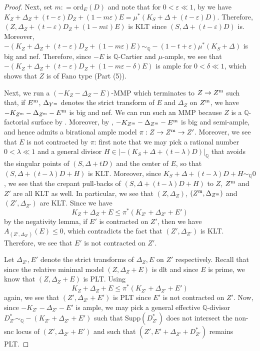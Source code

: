 \documentclass[11pt,reqno]{amsart}
\newcommand{\Q}{\mathbb{Q}}
\newcommand{\fm}{\mathfrak{m}}
\numberwithin{equation}{section}
\theoremstyle{definition}
\begin{document}
\begin{proof}
    Next, set $m : = \text{ord}_E (D)$ and note that for $0 < \varepsilon \ll 1$, by  we have $K_Z + \Delta_Z + (t - \varepsilon) D_Z + ( 1 - m \varepsilon )E = \mu^* (K_S + \Delta + (t - \varepsilon)D)$. Therefore, $(Z, \Delta_Z +  (t - \varepsilon) D_Z + (1 - m\varepsilon) E)$ is KLT since $(S, \Delta + (t - \varepsilon)D)$ is.
     Moreover, $- (K_Z + \Delta_Z + (t - \varepsilon) D_Z + ( 1 - m \varepsilon )E) \sim_\Q -(1 - t + \varepsilon) \mu^* (K_S + \Delta)$ is big and nef. Therefore, since $-E$ is $\Q$-Cartier and $\mu$-ample, we see that $- (K_Z + \Delta_Z + (t - \varepsilon) D_Z + ( 1 - m \varepsilon  - \delta)E)$ is ample for $0 < \delta \ll 1$, which shows that $Z$ is of Fano type (Part (5)).

    Next, we run a $(-K_Z-\Delta_Z-E)$-MMP which terminates to $Z \to Z^{\rm m}$ such that, if $E^{\rm m} $, $\Delta_{Y^{\rm m}}$ denotes the strict transform of $E$ and $\Delta_Z$ on $Z^{\rm m}$, we have $-K_{Z^{\rm m}} -\Delta_{Z^{\rm m}} -E^{\rm m}$ is big and nef. We can run such an MMP because $Z$ is a $\Q$-factorial surface by \cite[Theorem 3.27]{TanakaMMPforlogsurfaces}. Moreover, by \cite[Proposition 3.29]{TanakaMMPforlogsurfaces}, $-K_{Z^{\rm m}} -\Delta_{Z^{\rm m}} -E^{\rm m}$ is big and semi-ample, and hence admits a birational ample model $\pi: Z \to Z^{\rm m} \to Z'$. Moreover, we see that $E$ is not contracted by $\pi$: first note that we may pick a rational number $0 < \lambda \ll 1$ and a general divisor $H \in |- (K_S + \Delta + (t - \lambda)D)|_\Q $ that avoids the singular points of $(S, \Delta + tD)$ and the center of $E$, so that $(S, \Delta + (t- \lambda)D + H)$ is KLT. Moreover, since $K_S + \Delta + (t - \lambda) D + H \sim _\Q 0$, we see that the crepant pull-backs of $(S, \Delta + (t- \lambda)D + H)$ to $Z$, $Z^{\rm m}$ and $Z'$ are all KLT as well. In particular, we see that $(Z, \Delta_Z)$, $(Z^{\fm}, \Delta_{Z^{\rm m}})$ and $(Z', \Delta_{Z'})$ are KLT. Since we have
    \[ K_Z + \Delta_Z + E \leq \pi^*(K_{Z'} + \Delta_{Z'} + E')  \]
    by the negativity lemma, if $E'$ is contracted on $Z'$, then we have $A_{(Z', \Delta_{Z'})} (E) \leq 0$, which contradicts the fact that $(Z', \Delta_{Z'})$ is KLT. Therefore, we see that $E'$ is not contracted on $Z'$.
    
    Let $\Delta_{Z'},E'$ denote the strict transforms of $\Delta_Z, E$ on $Z'$ respectively. Recall that since the relative minimal model $(Z, \Delta_Z + E)$ is dlt and since $E$ is prime, we know that $(Z, \Delta_Z + E)$ is PLT. Using
    \[ K_Z + \Delta_Z + E \leq \pi^*(K_{Z'} + \Delta_{Z'} + E')  \]
    again, we see that $(Z', \Delta_{Z'} + E')$ is PLT since $E'$ is not contracted on $Z'$. Now, since $- K_{Z'} - \Delta_{Z'} - E'$ is ample, we may pick a general effective $\Q$-divisor $D^* _{Z'} \sim_\Q -(K_{Z'}+ \Delta_{Z'} + E')$ such that $\text{Supp}(D_{Z'} ^*) $ does not intersect the non-snc locus of $(Z', \Delta_{Z'} +E')$ and such that $(Z', E'+ \Delta_{Z'} + D^* _{Z'}) $ remains PLT.  


\end{proof}
\end{document}
